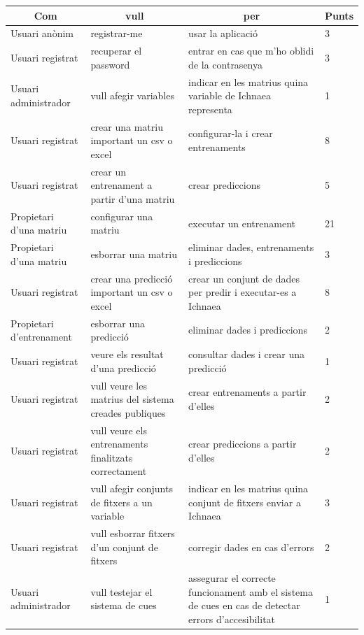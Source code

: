 \begin{center}
\begin{longtable}{ | p{3cm} | p{5cm} | p{5cm} | p{1cm} | }
\hline
\multicolumn{1}{|c|}{\textbf{Com}} & \multicolumn{1}{|c|}{\textbf{vull}} & \multicolumn{1}{|c|}{\textbf{per}} &\multicolumn{1}{|c|}{\textbf{Punts}} \\ \hline
Usuari anònim &	registrar-me &	usar la aplicació &	3 \\ \hline
Usuari registrat &	recuperar el password & entrar en cas que m'ho oblidi de la contrasenya & 3 \\ \hline
Usuari administrador &	vull afegir variables & indicar en les matrius quina variable de Ichnaea representa & 1 \\ \hline
Usuari registrat &	crear una matriu important un csv o excel & configurar-la i crear entrenaments & 8 \\ \hline
Usuari registrat &	crear un entrenament a partir d'una matriu & crear prediccions & 5 \\ \hline
Propietari d'una matriu & configurar una matriu & executar un entrenament & 21 \\ \hline
Propietari d'una matriu	& esborrar una matriu & eliminar dades, entrenaments i prediccions & 3 \\ \hline
Usuari registrat &	crear una predicció important un csv o excel & crear un conjunt de dades per predir i executar-es a Ichnaea & 8 \\ \hline
Propietari d'entrenament & 	esborrar una predicció & eliminar dades i prediccions & 2 \\ \hline
Usuari registrat & veure els resultat d'una predicció & consultar dades i crear una predicció & 1 \\ \hline
Usuari registrat & vull veure les matrius del sistema creades publiques & crear entrenaments a partir d'elles & 2  \\ \hline
Usuari registrat & vull veure els entrenaments finalitzats correctament	 & crear prediccions a partir d'elles & 2  \\ \hline
Usuari registrat & vull afegir conjunts de fitxers a un variable & indicar en les matrius quina conjunt de fitxers enviar a Ichnaea & 3  \\ \hline
Usuari registrat & vull esborrar fitxers d'un conjunt de fitxers & corregir dades en cas d'errors & 2 \\ \hline
Usuari administrador & vull testejar el sistema de cues & assegurar el correcte funcionament amb el sistema de cues en cas de detectar errors d'accesibilitat & 1 \\ \hline

\end{longtable}
\end{center}
